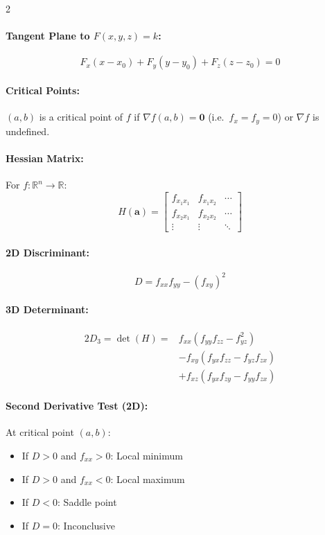 \begin{multicols}{2}
\paragraph{Tangent Plane to $F(x,y,z) = k$:}
\[
F_x(x-x_0) + F_y(y-y_0) + F_z(z-z_0) = 0
\]

\paragraph{Critical Points:}
$(a,b)$ is a critical point of $f$ if $\nabla f(a,b) = \mathbf{0}$ (i.e.\ $f_x = f_y = 0$) or $\nabla f$ is undefined.
\paragraph{Hessian Matrix:}
For \(f: \mathbb{R}^n \to \mathbb{R}\):
\[
H(\mathbf{a}) = \begin{bmatrix}
f_{x_1x_1} & f_{x_1x_2} & \cdots \\
f_{x_2x_1} & f_{x_2x_2} & \cdots \\
\vdots & \vdots & \ddots
\end{bmatrix}
\]

\paragraph{2D Discriminant:}
\[
D = f_{xx}f_{yy} - (f_{xy})^2
\]


\paragraph{3D Determinant:}
\begin{alignat*}{2}
D_3 = \det(H) = &f_{xx}(f_{yy}f_{zz} - f_{yz}^2) \\
&- f_{xy}(f_{yx}f_{zz} - f_{yz}f_{zx}) \\
&+ f_{xz}(f_{yx}f_{zy} - f_{yy}f_{zx})
\end{alignat*}

\paragraph{Second Derivative Test (2D):}
At critical point \((a,b)\):
\begin{itemize}
    \item If \(D > 0\) and \(f_{xx} > 0\): Local minimum
    \item If \(D > 0\) and \(f_{xx} < 0\): Local maximum
    \item If \(D < 0\): Saddle point
    \item If \(D = 0\): Inconclusive
\end{itemize}

\end{multicols}
